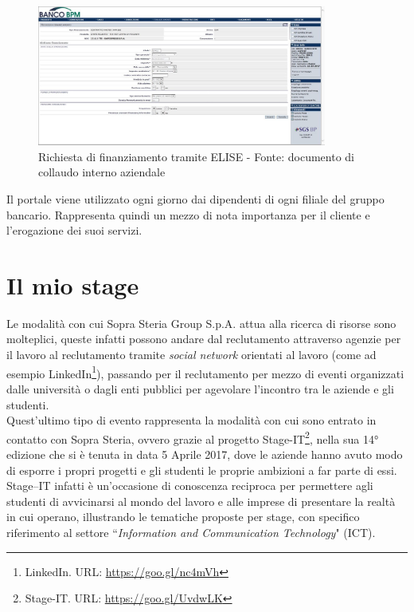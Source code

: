 	\begin{figure}[H]
		\centering
	   	\includegraphics[width=0.85\textwidth]{immagini/RichiestaFinanziamento}
	   	\caption{Richiesta di finanziamento tramite ELISE - Fonte: documento di collaudo interno aziendale}
	\end{figure}
	
	Il portale viene utilizzato ogni giorno dai dipendenti di ogni filiale del gruppo bancario. Rappresenta quindi un mezzo di nota importanza per il cliente	e l'erogazione dei suoi servizi.

		
\section{Il mio stage}

Le modalità con cui Sopra Steria Group S.p.A. attua alla ricerca di risorse sono molteplici, queste infatti possono andare dal reclutamento attraverso agenzie per il lavoro al reclutamento tramite \textit{social network} orientati al lavoro (come ad esempio LinkedIn\footnote{LinkedIn. URL: \url{https://goo.gl/nc4mVh}}), passando per il reclutamento per mezzo di eventi organizzati dalle università o dagli enti pubblici per agevolare l'incontro tra le aziende e gli studenti.\\

Quest'ultimo tipo di evento rappresenta la modalità con cui sono entrato in contatto con Sopra Steria, ovvero grazie al progetto Stage-IT\footnote{Stage-IT. URL: \url{https://goo.gl/UvdwLK}}, nella sua \ang{14} edizione che si è tenuta in data 5 Aprile 2017, dove le aziende hanno avuto modo di esporre i propri progetti e gli studenti le proprie ambizioni a far parte di essi. Stage–IT infatti è un'occasione di conoscenza reciproca per permettere agli studenti di avvicinarsi al mondo del lavoro e alle imprese di presentare la realtà in cui operano, illustrando le tematiche proposte per stage, con specifico riferimento al settore “\textit{Information and Communication Technology}" (ICT).\\

